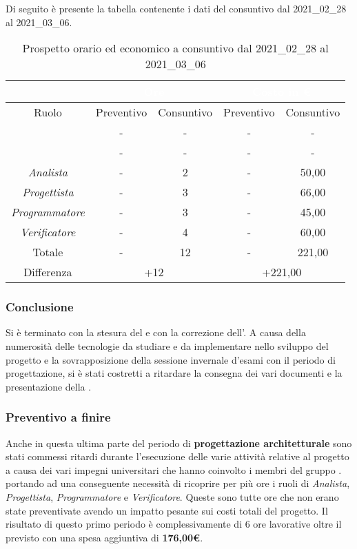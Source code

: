 Di seguito è presente la tabella contenente i dati del consuntivo dal 2021\_02\_28 al 2021\_03\_06.
\begin{table}[H]
	\centering
	\begin{tabular}{|c|c|c|c|c|}
		\rowcolor{darkblue} 
		&\multicolumn{2}{c|}{\textcolor{white}{Ore}}&\multicolumn{2}{c|}{\textcolor{white}{Costo in €}}\\ \hline
		Ruolo			&	Preventivo				&	Consuntivo		&	Preventivo	&	Consuntivo\\ \hline
		{\Responsabile}		&	-					&	-				&	-			&	- \\ \hline
		{\Amministratore}	&	-					&	-				&	-			&	- \\ \hline
		\textit{Analista}	&	-					&	2				&	-			&	50,00 \\ \hline
		\textit{Progettista}& 	-					&   3 				& 	-			&  	66,00 \\ \hline
		\textit{Programmatore}& -					& 	3				& 	-			&  	45,00 \\ \hline
		\textit{Verificatore}&	-					&	4				&	-			&	60,00 \\ \hline
		Totale				&	-					&	12				&	-			&	221,00 \\ \hline
		Differenza			& 	\multicolumn{2}{c|}{+12} 				&\multicolumn{2}{c|}{+221,00}\\ \hline
	\end{tabular}
	\caption{Prospetto orario ed economico a consuntivo dal 2021\_02\_28 al 2021\_03\_06}
\end{table}
\subsubsection{Conclusione}
Si è terminato con la stesura del  e con la correzione dell'\AdR{}. A causa della numerosità delle tecnologie da studiare e da implementare nello sviluppo del progetto e la sovrapposizione della sessione invernale d'esami con il periodo di progettazione, si è stati costretti a ritardare la consegna dei vari documenti e la presentazione della .
\subsubsection{Preventivo a finire}
Anche in questa ultima parte del periodo di \textbf{progettazione architetturale} sono stati commessi ritardi durante l'esecuzione delle varie attività relative al progetto a causa dei vari impegni universitari che hanno coinvolto i membri del gruppo {\Gruppo}. portando ad una conseguente necessità di ricoprire per più ore i ruoli di \textit{Analista}, \textit{Progettista}, \textit{Programmatore} e \textit{Verificatore}. Queste sono tutte ore che non erano state preventivate avendo un impatto pesante sui costi totali del progetto.
Il risultato di questo primo periodo è complessivamente di 6 ore lavorative oltre il previsto con una spesa aggiuntiva di \textbf{176,00€}.